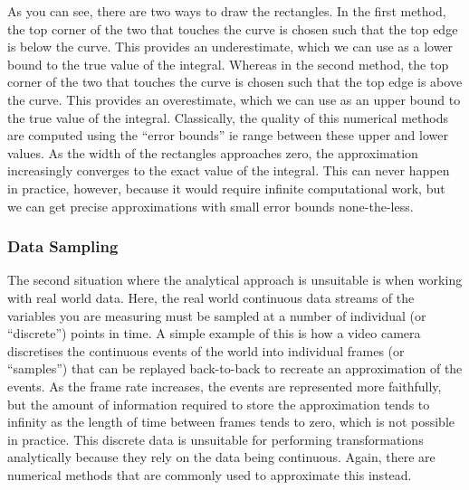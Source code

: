 \documentclass[12pt]{article}
\begin{document}
    As you can see, there are two ways to draw the rectangles.
    In the first method, the top corner of the two that touches the curve is chosen such that the top edge is below the curve.
    This provides an underestimate, which we can use as a lower bound to the true value of the integral.
    Whereas in the second method, the top corner of the two that touches the curve is chosen such that the top edge is above the curve.
    This provides an overestimate, which we can use as an upper bound to the true value of the integral.
    Classically, the quality of this numerical methods are computed using the ``error bounds'' ie range between these upper and lower values.
    As the width of the rectangles approaches zero, the approximation increasingly converges to the exact value of the integral.
    This can never happen in practice, however, because it would require infinite computational work, but we can get precise approximations with small error bounds none-the-less.

    \subsubsection{Data Sampling}
    The second situation where the analytical approach is unsuitable is when working with real world data.
    Here, the real world continuous data streams of the variables you are measuring must be sampled at a number of individual (or ``discrete'') points in time.
    A simple example of this is how a video camera discretises the continuous events of the world into individual frames (or ``samples'') that can be replayed back-to-back to recreate an approximation of the events.
    As the frame rate increases, the events are represented more faithfully, but the amount of information required to store the approximation tends to infinity as the length of time between frames tends to zero, which is not possible in practice.
    This discrete data is unsuitable for performing transformations analytically because they rely on the data being continuous.
    Again, there are numerical methods that are commonly used to approximate this instead.
\end{document}
